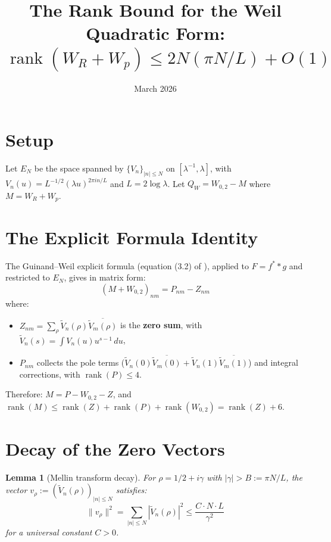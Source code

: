 \documentclass[11pt]{article}
\title{The Rank Bound for the Weil Quadratic Form:\\$\operatorname{rank}(W_R + W_p) \leq 2N(\pi N/L) + O(1)$}
\date{March 2026}
\newtheorem{lemma}{Lemma}
\begin{document}
\maketitle

\section{Setup}

Let $E_N$ be the space spanned by $\{V_n\}_{|n|\leq N}$ on $[\lambda^{-1},\lambda]$, with $V_n(u) = L^{-1/2}(\lambda u)^{2\pi i n/L}$ and $L = 2\log\lambda$. Let $Q_W = W_{0,2} - M$ where $M = W_R + W_p$.

\section{The Explicit Formula Identity}

The Guinand--Weil explicit formula (equation (3.2) of \cite{CCM2025}), applied to $F = f^* * g$ and restricted to $E_N$, gives in matrix form:
\begin{equation}\label{eq:explicit}
(M + W_{0,2})_{nm} = P_{nm} - Z_{nm}
\end{equation}
where:
\begin{itemize}
\item $Z_{nm} = \sum_\rho \tilde{V}_n(\rho)\overline{\tilde{V}_m(\rho)}$ is the \textbf{zero sum}, with $\tilde{V}_n(s) = \int V_n(u) u^{s-1}\,du$,
\item $P_{nm}$ collects the pole terms ($\tilde{V}_n(0)\overline{\tilde{V}_m(0)} + \tilde{V}_n(1)\overline{\tilde{V}_m(1)}$) and integral corrections, with $\operatorname{rank}(P) \leq 4$.
\end{itemize}

Therefore: $M = P - W_{0,2} - Z$, and $\operatorname{rank}(M) \leq \operatorname{rank}(Z) + \operatorname{rank}(P) + \operatorname{rank}(W_{0,2}) = \operatorname{rank}(Z) + 6$.

\section{Decay of the Zero Vectors}

\begin{lemma}[Mellin transform decay]\label{lem:decay}
For $\rho = 1/2 + i\gamma$ with $|\gamma| > B := \pi N/L$, the vector $v_\rho := (\tilde{V}_n(\rho))_{|n|\leq N}$ satisfies:
\[
\|v_\rho\|^2 = \sum_{|n|\leq N} |\tilde{V}_n(\rho)|^2 \leq \frac{C \cdot N \cdot L}{\gamma^2}
\]
for a universal constant $C > 0$.
\end{lemma}
\end{document}
